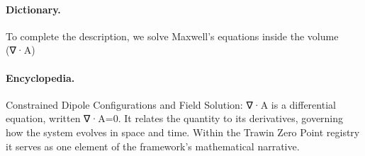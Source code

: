 \paragraph{Dictionary.}
To complete the description, we solve Maxwell's equations inside the volume (∇·A)

\paragraph{Encyclopedia.}
Constrained Dipole Configurations and Field Solution: ∇·A is a differential equation, written ∇·A=0. It relates the quantity to its derivatives, governing how the system evolves in space and time. Within the Trawin Zero Point registry it serves as one element of the framework's mathematical narrative.
